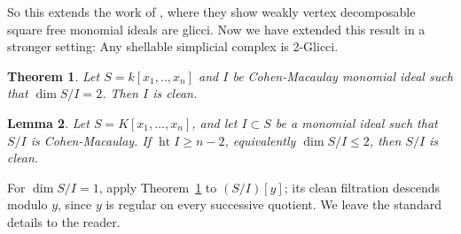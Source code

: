\documentclass[11pt,letterpaper]{amsart}
\DeclareMathOperator{\Ass}{Ass}
\theoremstyle{plain}
\newtheorem{thm}{Theorem}[section]
\newtheorem{lem}[thm]{Lemma}
\theoremstyle{definition}
\theoremstyle{remark}
\begin{document}
So this extends the work of \cite{nagel2008glicci}, where they show 
weakly vertex decomposable square free monomial ideals are glicci. Now we have extended this result in a stronger setting: Any shellable simplicial complex is 2-Glicci.

\begin{thm}\cite[Corollary~3.4]{popescu2009stanley}\label{Popsescu} Let $S=k[x_1,..,x_n]$ and $I$ be Cohen-Macaulay monomial ideal such that $\dim S/I=2$. Then $I$ is clean.    
\end{thm}

\begin{lem}
Let \(S=K[x_1,\ldots,x_n]\), and let \(I\subset S\) be a monomial ideal such that \(S/I\) is Cohen-Macaulay. If \(\operatorname{ht}I\ge n-2\), equivalently \(\dim S/I\le 2\), then \(S/I\) is clean.
\end{lem}

For $\dim S/I=1$, apply Theorem~\ref{Popsescu} to $(S/I)[y]$; its clean
filtration descends modulo $y$, since $y$ is regular on
every successive quotient. We leave the standard details
to the reader.

\end{document}
